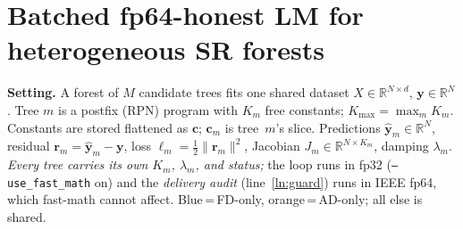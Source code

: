 \documentclass[11pt]{article}
\newcommand{\yhat}{\hat{\mathbf{y}}}
\newcommand{\fdonly}[1]{\textcolor{blue!70!black}{#1}}
\newcommand{\adonly}[1]{\textcolor{orange!80!black}{#1}}
\begin{document}
\section*{Batched fp64-honest LM for heterogeneous SR forests}

\noindent\textbf{Setting.} A forest of $M$ candidate trees fits one shared dataset
$X\!\in\!\mathbb{R}^{N\times d}$, $\mathbf{y}\!\in\!\mathbb{R}^{N}$. Tree $m$ is a postfix
(RPN) program with $K_m$ free constants; $K_{\max}\!=\!\max_m K_m$. Constants are stored
flattened as $\mathbf{c}$; $\mathbf{c}_m$ is tree~$m$'s slice. Predictions
$\yhat_m\!\in\!\mathbb{R}^N$, residual $\mathbf{r}_m\!=\!\yhat_m-\mathbf{y}$, loss
$\ell_m=\tfrac12\lVert\mathbf{r}_m\rVert^2$, Jacobian $J_m\!\in\!\mathbb{R}^{N\times K_m}$,
damping $\lambda_m$. \emph{Every tree carries its own $K_m$, $\lambda_m$, and status;}
the loop runs in fp32 (\texttt{--use\_fast\_math} on) and the \emph{delivery audit}
(line~\ref{ln:guard}) runs in IEEE fp64, which fast-math cannot affect.
\fdonly{Blue}\,=\,FD-only, \adonly{orange}\,=\,AD-only; all else is shared.
\end{document}
